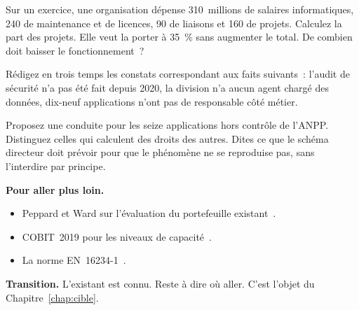 \begin{boxexo}[title={\ding{45}\quad Exercice~9.2. La dépense \niveaumoyen}]
Sur un exercice, une organisation dépense 310~millions de salaires informatiques, 240 de maintenance et de licences, 90 de liaisons et 160 de projets. Calculez la part des projets. Elle veut la porter à 35~\% sans augmenter le total. De combien doit baisser le fonctionnement~?
\end{boxexo}

\begin{boxexo}[title={\ding{45}\quad Exercice~9.3. Trois constats \niveaumoyen}]
Rédigez en trois temps les constats correspondant aux faits suivants~: l'audit de sécurité n'a pas été fait depuis 2020, la division n'a aucun agent chargé des données, dix-neuf applications n'ont pas de responsable côté métier.
\end{boxexo}

\begin{boxexo}[title={\ding{45}\quad Exercice~9.4. Les seize \niveauexpert}]
Proposez une conduite pour les seize applications hors contrôle de l'ANPP. Distinguez celles qui calculent des droits des autres. Dites ce que le schéma directeur doit prévoir pour que le phénomène ne se reproduise pas, sans l'interdire par principe.
\end{boxexo}

\bigskip

\begin{boxinfo}
\textbf{Pour aller plus loin.}
\begin{itemize}
    \item Peppard et Ward sur l'évaluation du portefeuille existant~\cite{wardpeppard2016}.
    \item COBIT~2019 pour les niveaux de capacité~\cite{cobit2019}.
    \item La norme EN~16234-1~\cite{ecf}.
\end{itemize}
\end{boxinfo}

\begin{boxinfo}
\textbf{Transition.} L'existant est connu. Reste à dire où aller. C'est l'objet du Chapitre~\ref{chap:cible}.
\end{boxinfo}
